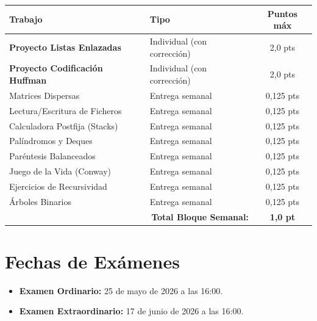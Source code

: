 \documentclass[spanish,12pt,a4paper]{article}
\begin{document}
\begin{table}[H]
\centering
\renewcommand{\arraystretch}{1.2}
\begin{tabular}{llc}
\toprule
\textbf{Trabajo} & \textbf{Tipo} & \textbf{Puntos m\'{a}x} \\
\midrule
\textbf{Proyecto Listas Enlazadas} & Individual (con correcci\'{o}n) & 2,0 pts \\
\textbf{Proyecto Codificaci\'{o}n Huffman} & Individual (con correcci\'{o}n) & 2,0 pts \\
\midrule
Matrices Dispersas & Entrega semanal & 0,125 pts \\
Lectura/Escritura de Ficheros & Entrega semanal & 0,125 pts \\
Calculadora Postfija (Stacks) & Entrega semanal & 0,125 pts \\
Pal\'{i}ndromos y Deques & Entrega semanal & 0,125 pts \\
Par\'{e}ntesis Balanceados & Entrega semanal & 0,125 pts \\
Juego de la Vida (Conway) & Entrega semanal & 0,125 pts \\
Ejercicios de Recursividad & Entrega semanal & 0,125 pts \\
\'{A}rboles Binarios & Entrega semanal & 0,125 pts \\
\midrule
\multicolumn{2}{r}{\textbf{Total Bloque Semanal:}} & \textbf{1,0 pt} \\
\bottomrule
\end{tabular}
\end{table}

\section*{Fechas de Ex\'{a}menes}
\begin{itemize}
    \item \textbf{Examen Ordinario:} 25 de mayo de 2026 a las 16:00.
    \item \textbf{Examen Extraordinario:} 17 de junio de 2026 a las 16:00.
\end{itemize}
\end{document}
